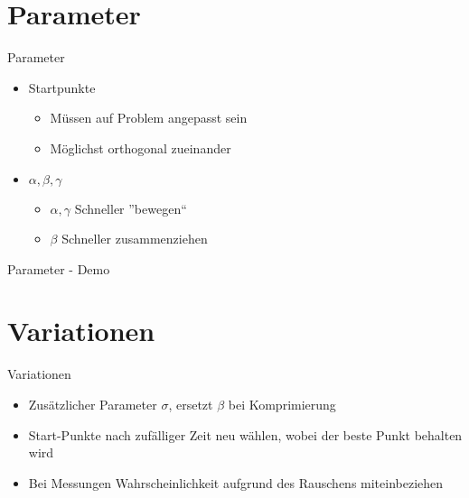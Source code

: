 \section{Parameter} 

\begin{frame}{Parameter}
\begin{itemize}
\item Startpunkte
\begin{itemize}
\item Müssen auf Problem angepasst sein
\item Möglichst orthogonal zueinander
\end{itemize}
\pause \item $\alpha, \beta , \gamma$
\begin{itemize}
\item $\alpha, \gamma$ Schneller ''bewegen`` 
\item $\beta$ Schneller zusammenziehen
\end{itemize}
\end{itemize}
\end{frame}

\begin{frame}{Parameter - Demo}
\end{frame}

\section{Variationen}
\begin{frame}{Variationen}
\begin{itemize}
\item Zusätzlicher Parameter $\sigma$, ersetzt $\beta$ bei Komprimierung
\item Start-Punkte nach zufälliger Zeit neu wählen, wobei der beste Punkt behalten wird
\item Bei Messungen Wahrscheinlichkeit aufgrund des Rauschens miteinbeziehen

\end{itemize}
\end{frame}